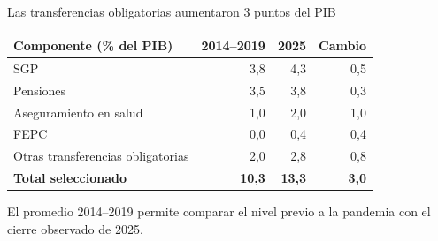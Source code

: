 \begin{frame}{Las transferencias obligatorias aumentaron 3 puntos del PIB}
\centering
\small
\begin{tabular}{lrrr}
\toprule
\textbf{Componente (\% del PIB)} & \textbf{2014--2019} & \textbf{2025} & \textbf{Cambio} \\
\midrule
SGP                               & 3,8 & 4,3 & 0,5 \\
Pensiones                         & 3,5 & 3,8 & 0,3 \\
Aseguramiento en salud            & 1,0 & 2,0 & 1,0 \\
FEPC                              & 0,0 & 0,4 & 0,4 \\
Otras transferencias obligatorias & 2,0 & 2,8 & 0,8 \\
\midrule
\textbf{Total seleccionado}       & \textbf{10,3} & \textbf{13,3} & \textbf{3,0} \\
\bottomrule
\end{tabular}

\vspace{0.25cm}
\scriptsize El promedio 2014--2019 permite comparar el nivel previo a la pandemia con el cierre observado de 2025.
\end{frame}